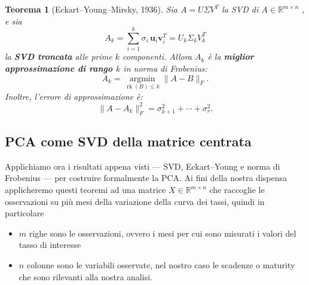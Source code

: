 \documentclass[11pt,a4paper]{article}
\theoremstyle{plain}
\newtheorem{teorema}{Teorema}[section]
\theoremstyle{definition}
\theoremstyle{remark}
\begin{document}
\begin{teorema}[Eckart--Young--Mirsky, 1936]
\label{thm:ey}
Sia $A = U \Sigma V^T$ la SVD di $A \in \mathbb{R}^{m \times n}$ , e sia
\[
  A_k = \sum_{i=1}^{k} \sigma_i \, \mathbf{u}_i \mathbf{v}_i^T
  = U_k \Sigma_k V_k^T
\]
la \textbf{SVD troncata} alle prime $k$ componenti. Allora $A_k$ è la
\textbf{miglior approssimazione di rango $k$} in norma di Frobenius:
\[
  A_k = \operatorname*{argmin}_{\operatorname{rk}(B) \leq k} \|A - B\|_F.
\]
Inoltre, l'errore di approssimazione è:
\begin{equation}
  \|A - A_k\|_F^2 = \sigma_{k+1}^2 + \cdots + \sigma_r^2.
  \label{eq:ey_errore}
\end{equation}
\end{teorema}





\subsection{PCA come SVD della matrice centrata}

Applichiamo ora i risultati appena visti — SVD, Eckart–Young e norma di
Frobenius — per costruire formalmente la PCA. 
Ai fini della nostra dispensa applicheremo questi teoremi ad una matrice $X \in \mathbb{R}^{m \times n}$ che raccoglie le osservazioni su più mesi della variazione della curva dei tassi, quindi in particolare
\begin{itemize}
\item $m$ righe sono le osservazioni, ovvero i mesi per cui sono misurati i
valori del tasso di interesse
\item $n$ colonne sono le variabili
osservate, nel nostro caso le scadenze o maturity che sono rilevanti alla nostra analisi.
\end{itemize}
\end{document}
